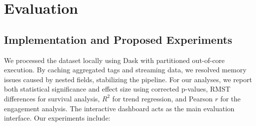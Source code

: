 \documentclass[sigconf,11pt]{acmart}
\begin{document}
\section{Evaluation}

\subsection{Implementation and Proposed Experiments}
\label{sec:experiments}

We processed the dataset locally using Dask with partitioned out-of-core execution. By caching aggregated tags and streaming data, we resolved memory issues caused by nested fields, stabilizing the pipeline. For our analyses, we report both statistical significance and effect size using corrected p-values, RMST differences for survival analysis, $R^2$ for trend regression, and Pearson $r$ for the engagement analysis. The interactive dashboard acts as the main evaluation interface. Our experiments include:
\end{document}
